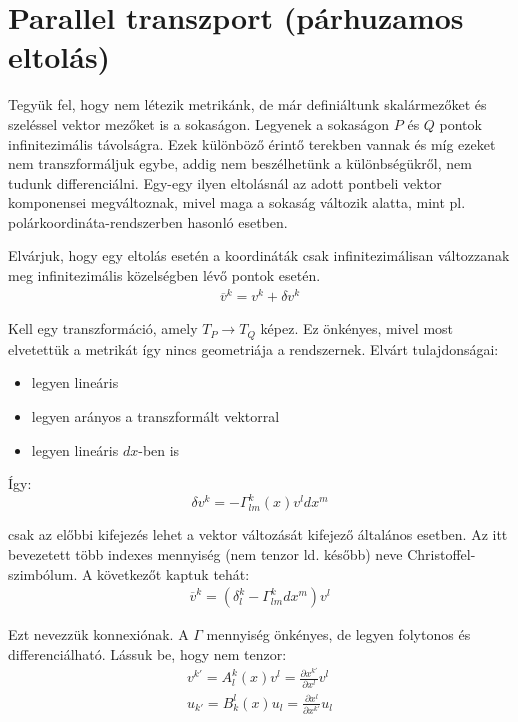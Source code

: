 \documentclass[a4paper,12pt]{article}
\begin{document}
\section{ Parallel transzport (párhuzamos eltolás)}
\par Tegyük fel, hogy nem létezik metrikánk, de már definiáltunk skalármezőket és szeléssel vektor mezőket is a sokaságon. Legyenek a sokaságon $P$ és $Q$ pontok infinitezimális távolságra. Ezek különböző érintő terekben vannak és míg ezeket nem transzformáljuk egybe, addig nem beszélhetünk a különbségükről, nem tudunk differenciálni. Egy-egy ilyen eltolásnál az adott pontbeli vektor komponensei megváltoznak, mivel maga a sokaság változik alatta, mint pl. polárkoordináta-rendszerben hasonló esetben.
\par Elvárjuk, hogy egy eltolás esetén a koordináták csak infinitezimálisan változzanak meg infinitezimális közelségben lévő pontok esetén. 
\begin{gather*}
    \overline{v}^{k} = v^{k} + \delta v^{k}
\end{gather*}
\par Kell egy transzformáció, amely $T_{P} \rightarrow T_{Q}$ képez. Ez önkényes, mivel most elvetettük a metrikát így nincs geometriája a rendszernek. Elvárt tulajdonságai:
\begin{itemize}
    \item legyen lineáris
    \item legyen arányos a transzformált vektorral
    \item legyen lineáris $dx$-ben is
\end{itemize}
\par Így:
\begin{equation*}
    \delta v^{k} = - \Gamma_{lm}^{k}(x)v^{l}dx^{m} 
\end{equation*}
\par csak az előbbi kifejezés lehet a vektor változását kifejező általános esetben. Az itt bevezetett több indexes mennyiség (nem tenzor ld. később) neve Christoffel-szimbólum. A következőt kaptuk tehát:
\begin{gather*}
    \overline{v}^{k} = (\delta_{l}^{k} - \Gamma_{lm}^{k}dx^{m})v^{l}
\end{gather*}
\par Ezt nevezzük konnexiónak. A $\Gamma$ mennyiség önkényes, de legyen folytonos és differenciálható. Lássuk be, hogy nem tenzor:
\begin{gather*}
    v^{k\prime} = A_{l}^{k}(x) v^{l} = \frac{\partial x^{k\prime}}{\partial x^{l}}v^{l} \\
    u_{k\prime} = B_{k}^{l}(x) u_{l} = \frac{\partial x^{l}}{\partial x^{k\prime}}u_{l} 
\end{gather*}
\end{document}
